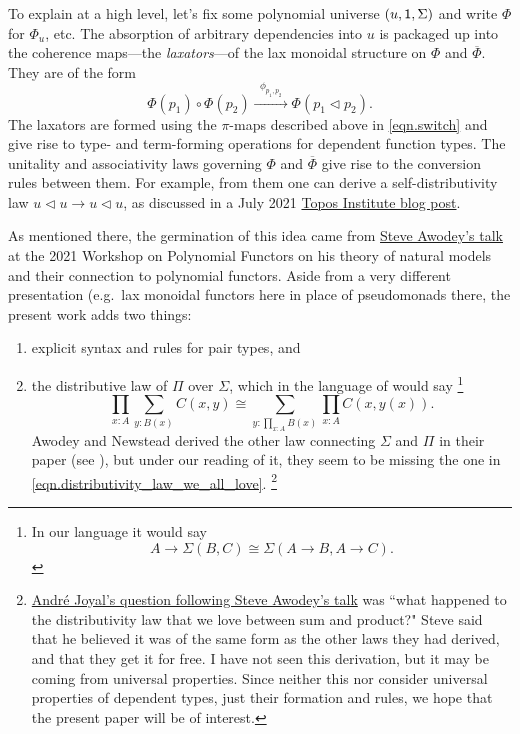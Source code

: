 \documentclass[11pt, one side, article]{memoir}
\theoremstyle{definition}
\theoremstyle{plain}
\newcommand{\Too}[1]{\xrightarrow{\;\;#1\;\;}}
\newcommand{\ol}[1]{\overline{#1}}
\newcommand{\0}{\textsf{0}}
\newcommand{\1}{\tn{\textsf{1}}}
\newcommand{\tri}{\mathbin{\triangleleft}}
\newcommand{\switch}{\pi}
\begin{document}
To explain at a high level, let's fix some polynomial universe $(u,\1,\Sigma)$ and write $\Phi$ for $\Phi_u$, etc. The absorption of arbitrary dependencies into $u$ is packaged up into the coherence maps---the \emph{laxators}---of the lax monoidal structure on $\Phi$ and $\ol{\Phi}$. They are of the form
\[
\Phi(p_1)\circ\Phi(p_2)
\Too{\phi_{p_1,p_2}}
\Phi(p_1\tri p_2).
\]
The laxators are formed using the $\switch$-maps described above in \eqref{eqn.switch} and give rise to type- and term-forming operations for dependent function types. The unitality and associativity laws governing $\Phi$ and $\ol{\Phi}$ give rise to the conversion rules between them. For example, from them one can derive a self-distributivity law $u\tri u\to u\tri u$, as discussed in a July 2021 \href{https://topos.site/blog/2021/07/jump-monads-from-conjugation-to-dependent-types/}{Topos Institute blog post}.

As mentioned there, the germination of this idea came from \href{https://www.youtube.com/watch?v=RDuNIP4icKI\&t=10765s}{Steve Awodey's talk} at the 2021 Workshop on Polynomial Functors on his theory of natural models and their connection to polynomial functors. Aside from a very different presentation (e.g.\ lax monoidal functors here in place of pseudomonads there, the present work adds two things:
\begin{enumerate}
	\item explicit syntax and rules for pair types, and
	\item the distributive law of $\Pi$ over $\Sigma$, which in the language of \cite{awodey2018polynomial} would say%
	\footnote{In our language it would say 
	\[
	A\to\Sigma(B,C)\cong \Sigma(A\to B,A\to C).
	\]
	}
	\begin{equation}\label{eqn.distributivity_law_we_all_love}
	\prod_{x:A}\sum_{y:B(x)}C(x,y)\cong\sum_{y:\prod_{x:A}B(x)}\prod_{x:A}C(x,y(x)).
	\end{equation}
	Awodey and Newstead derived the other law connecting $\Sigma$ and $\Pi$ in their paper (see \cite[Remark 4.2]{awodey2018polynomial}), but under our reading of it, they seem to be missing the one in \eqref{eqn.distributivity_law_we_all_love}.%
	\footnote{\href{https://youtu.be/RDuNIP4icKI?t=13898}{Andr\'{e} Joyal's question following Steve Awodey's talk} was ``what happened to the distributivity law that we love between sum and product?" Steve said that he believed it was of the same form as the other laws they had derived, and that they get it for free. I have not seen this derivation, but it may be coming from universal properties. Since neither this nor \cite{awodey2018polynomial} consider universal properties of dependent types, just their formation and rules, we hope that the present paper will be of interest.
	}
\end{enumerate}
\end{document}
